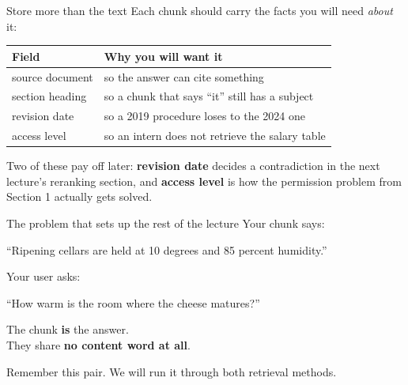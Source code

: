 \documentclass[aspectratio=169]{beamer}
\newcommand{\takebox}[1]{%
  \begin{tcolorbox}[colback=paramgreen!8, colframe=paramgreen, boxrule=0.6pt, arc=2pt]
  #1
  \end{tcolorbox}}
\begin{document}
\begin{frame}{Store more than the text}
  \vspace{0.6em}
  Each chunk should carry the facts you will need \emph{about} it:

  \vspace{0.8em}
  \begin{center}
  \small
  \begin{tabular}{ll}
    \toprule
    \textbf{Field} & \textbf{Why you will want it} \\
    \midrule
    source document & so the answer can cite something \\
    section heading & so a chunk that says ``it'' still has a subject \\
    revision date   & so a 2019 procedure loses to the 2024 one \\
    access level    & so an intern does not retrieve the salary table \\
    \bottomrule
  \end{tabular}
  \end{center}

  \vspace{1.0em}
  \takebox{Two of these pay off later: \textbf{revision date} decides a contradiction in
  the next lecture's reranking section, and \textbf{access level} is how the permission
  problem from Section 1 actually gets solved.}
\end{frame}

\begin{frame}{The problem that sets up the rest of the lecture}
  \vspace{0.8em}
  Your chunk says:
  \begin{center}
  \begin{tcolorbox}[colback=lightbg, colframe=gray, boxrule=0.5pt, arc=2pt, width=0.82\textwidth]
    \small ``Ripening cellars are held at 10 degrees and 85 percent humidity.''
  \end{tcolorbox}
  \end{center}

  \vspace{0.3em}
  Your user asks:
  \begin{center}
  \begin{tcolorbox}[colback=lightbg, colframe=gray, boxrule=0.5pt, arc=2pt, width=0.82\textwidth]
    \small ``How warm is the room where the cheese matures?''
  \end{tcolorbox}
  \end{center}

  \vspace{0.9em}
  \begin{center}
    {\large The chunk \textbf{is} the answer.}\\[0.3em]
    {\large They share \textbf{no content word at all}.}
  \end{center}

  \vspace{0.7em}
  \begin{center}
  {\small\color{gray}Remember this pair. We will run it through both retrieval methods.}
  \end{center}
\end{frame}
\end{document}
